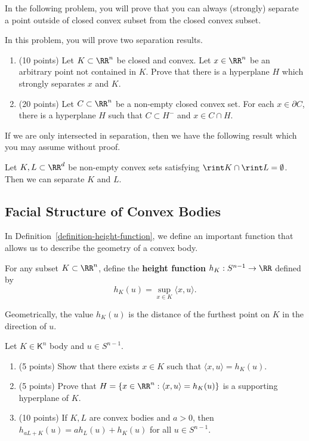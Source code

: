 \documentclass[11pt]{article}
\begin{document}
In the following problem, you will prove that you can always (strongly) separate a point outside of closed convex subset from the closed convex subset. 
\begin{prob}[30 points]
    In this problem, you will prove two separation results. 
\begin{enumerate}[label = (\alph*)]
    \item (10 points) Let $K \subset \RR^n$ be closed and convex. Let $x \in \RR^n$ be an arbitrary point not contained in $K$. Prove that there is a hyperplane $H$ which strongly separates $x$ and $K$.
    \item (20 points) Let $C \subset \RR^n$ be a non-empty closed convex set. For each $x \in \partial C$, there is a hyperplane $H$ such that $C \subset H^-$ and $x \in C \cap H$. 
\end{enumerate} 
\end{prob}

If we are only intersected in separation, then we have the following result which you may assume without proof. 

\begin{thm}
    Let $K, L \subset \RR^d$ be non-empty convex sets satisfying $\rint K \cap \rint L = \emptyset$. Then we can separate $K$ and $L$. 
\end{thm}

\subsection{Facial Structure of Convex Bodies}

In Definition~\ref{definition-height-function}, we define an important function that allows us to describe the geometry of a convex body. 

\begin{defn}\label{definition-height-function}
    For any subset $K \subset \RR^n$, define the \textbf{height function} $h_K : S^{n-1} \to \RR$ defined by 
    \[
        h_K(u) = \sup_{x \in K} \langle x, u \rangle.
    \] 
\end{defn}

Geometrically, the value $h_K(u)$ is the distance of the furthest point on $K$ in the direction of $u$.

\begin{prob} [20 points] \label{problem-height-function}
    Let $K \in \mathsf{K}^n$ body and $u \in S^{n-1}$.
    \begin{enumerate}[label = (\alph*)]
        \item (5 points) Show that there exists $x \in K$ such that $\langle x, u \rangle = h_K(u)$. 
        \item (5 points) Prove that $H = \{x \in \RR^n : \langle x, u \rangle = h_K(u)\}$ is a supporting hyperplane of $K$.
        \item (10 points) If $K, L$ are convex bodies and $a > 0$, then $h_{aL + K} (u) = a h_L(u) + h_K(u)$ for all $u \in S^{n-1}$.
    \end{enumerate}
\end{prob}
\end{document}
